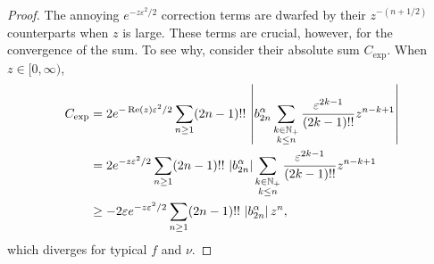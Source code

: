 \documentclass[11pt,a4paper,twoside,leqno,noamsfonts]{amsart}
\numberwithin{equation}{section}
\begin{document}
\begin{proof}
The annoying $e^{-z\varepsilon^2/2}$ correction terms are dwarfed by their $z^{-(n+1/2)}$ counterparts when $z$ is large. These terms are crucial, however, for the convergence of the sum. To see why, consider their absolute sum $C_\text{exp}$. When $z \in [0, \infty)$,
\begin{align*}
C_\text{exp} & = 2e^{-\operatorname{Re}(z)\varepsilon^2/2} \sum_{n \ge 1} (2n-1)!!\,\left| b_{2n}^\alpha \sum_{\substack{k \in \mathbb N_+ \\ k \le n}} \frac{\varepsilon^{2k-1}}{(2k-1)!!} z^{n-k+1} \right| \\
& = 2e^{-z\varepsilon^2/2} \sum_{n \ge 1} (2n-1)!!\,\left|b_{2n}^\alpha\right| \sum_{\substack{k \in \mathbb N_+ \\ k \le n}} \frac{\varepsilon^{2k-1}}{(2k-1)!!} z^{n-k+1} \\
& \ge -2\varepsilon e^{-z\varepsilon^2/2} \sum_{n \ge 1} (2n-1)!!\,\left|b_{2n}^\alpha\right| z^n,
\end{align*}
which diverges for typical $f$ and $\nu$.


\end{proof}
\end{document}
